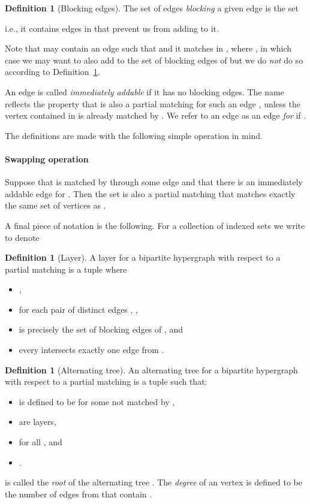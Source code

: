 \documentclass[11pt]{article}
\theoremstyle{definition}
\newtheorem{definition}[theorem]{Definition}
\theoremstyle{remark}
\begin{document}
\begin{definition}[Blocking edges]\label{def:blocking}
The set of
edges \textit{blocking} a given edge  is the set

i.e., it contains edges in  that prevent us from adding
 to it.
\end{definition}
Note that  may contain an edge  such that
 and it matches  in , where , in
which case we may want to also add  to the set of blocking edges
of  but we do \emph{not} do so according to Definition~\ref{def:blocking}.

An edge  is called \textit{immediately addable} if it has no
blocking edges. The name reflects the property that  is
also a partial matching for such an edge , unless the  vertex
contained in  is already matched by . We refer to an edge  as an edge \emph{for}
 if .



The definitions are made with the following simple operation in mind.

\paragraph{Swapping operation} Suppose that  is matched by
 through some edge  and that there is
an immediately addable edge  for . Then the set
 is also a partial matching
that matches exactly the same set of  vertices as
.

A final piece of notation is the following. For a collection of
indexed sets  we write  to denote


\begin{definition}[Layer]\label{def:layer}
  A layer  for a bipartite hypergraph  with respect to
  a partial matching  is a tuple  where
  \begin{itemize}
  \item ,
  \item for each pair of distinct edges   , ,
  \item  is precisely the set of blocking edges of , and
  \item every  intersects exactly one edge from .
  \end{itemize}
\end{definition}

\begin{definition}[Alternating tree]\label{def:alttree}
  An alternating tree  for a bipartite hypergraph 
  with respect to a partial matching  is a tuple 
   such that:
  \begin{itemize}
  \item  is defined to be  for some 
   not matched by ,
  \item  are layers,
\item  for all , and
\item .
  \end{itemize}
   is called the \emph{root} of the alternating tree . The
  \emph{degree} of an  vertex  is
  defined to be the number of edges from  that contain .
\end{definition}
\end{document}
